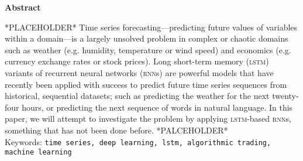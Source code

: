 \begin{center}
  \textbf{Abstract}

  \vspace{5mm}

  \small\parbox{0.8\textwidth}{
    *PLACEHOLDER* Time series forecasting---predicting future values of variables within a domain---is a largely unsolved problem in complex or chaotic domains such as weather (e.g. humidity, temperature or wind speed) and economics (e.g. currency exchange rates or stock prices). Long short-term memory (\textsc{lstm}) variants of recurrent neural networks (\textsc{rnn}s) are powerful models that have recently been applied with success to predict future time series sequences from historical, sequential datasets; such as predicting the weather for the next twenty-four hours, or predicting the next sequence of words in natural language. In this paper, we will attempt to investigate the problem by applying \textsc{lstm}-based \textsc{rnn}s, something that has not been done before. *PALCEHOLDER*\\

    Keywords: \texttt{time series, deep learning, lstm, algorithmic trading, machine learning}
  }
\end{center}
